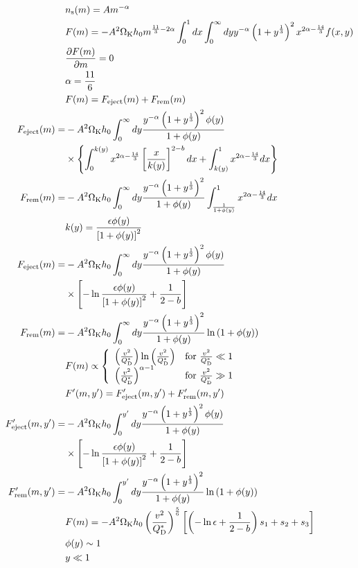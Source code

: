 \documentclass[11pt,a4paper,oneside,onecolumn]{jreport}
\begin{document}
\begin{align}
 &n_{\rm s} (m) = A m^{- \alpha}\\
 &F (m) = - A^2 \Omega_{\rm K} h_0 m^{\frac{11}{3} - 2 \alpha} \int_0^1 dx \int_0^{\infty} dy y^{-\alpha} \left( 1 + y^{\frac{1}{3}} \right)^2 x^{2 \alpha - \frac{14}{3}} f(x, y)\\
 &\frac{\partial F(m)}{\partial m} = 0\\ 
 &\alpha = \frac{11}{6}\\
 &F(m) = F_{\rm eject}(m) + F_{\rm rem}(m)\\
 F_{\rm eject}(m) = & - A^2 \Omega_{\rm K} h_0 \int_0^{\infty} dy \frac{y^{- \alpha} \left( 1 + y^{\frac{1}{3}} \right)^2 \phi(y)}{1 + \phi(y)}\\
 &\times \left\{ \int_0^{k(y)} x^{2 \alpha - \frac{14}{3}}\left[ \frac{x}{k(y)} \right]^{2-b} dx + \int_{k(y)}^1 x^{2 \alpha - \frac{14}{3}} dx \right\}\\
 F_{\rm rem}(m) = & - A^2 \Omega_{\rm K} h_0 \int_0^{\infty} dy \frac{y^{- \alpha} \left( 1 + y^{\frac{1}{3}} \right)^2}{1 + \phi(y)} \int_{\frac{1}{1 + \phi(y)}}^1 x^{2 \alpha - \frac{14}{3}} dx\\
 &k(y) = \frac{\epsilon \phi(y)}{\left[ 1 + \phi(y) \right]^2}\\
 F_{\rm eject}(m) = & - A^2 \Omega_{\rm K} h_0 \int_0^{\infty} dy \frac{y^{- \alpha} \left( 1 + y^{\frac{1}{3}} \right)^2 \phi(y)}{1 + \phi(y)}\\
 &\times \left[ - \ln \frac{\epsilon \phi(y)}{\left[ 1 + \phi(y) \right]^2} + \frac{1}{2 - b} \right]\\
 F_{\rm rem}(m) = & - A^2 \Omega_{\rm K} h_0 \int_0^{\infty} dy \frac{y^{- \alpha} \left( 1 + y^{\frac{1}{3}} \right)^2}{1 + \phi(y)} \ln \left( 1 + \phi(y) \right)\\
 &F(m) \propto \left\{
 \begin{array}{ll}
  \left(\frac{v^2}{Q_{\rm D}^{\ast}}\right) \ln \left(\frac{v^2}{Q_{\rm D}^{\ast}}\right) & {\rm for}\ \frac{v^2}{Q_{\rm D}^{\ast}} \ll 1\\
  \left(\frac{v^2}{Q_{\rm D}^{\ast}}\right)^{\alpha - 1} & {\rm for}\ \frac{v^2}{Q_{\rm D}^{\ast}} \gg 1\\
 \end{array}
 \right.\\
 &F'(m, y') = F'_{\rm eject} (m, y') + F'_{\rm rem} (m, y')\\
 F'_{\rm eject}(m, y') = & - A^2 \Omega_{\rm K} h_0 \int_0^{y'} dy \frac{y^{- \alpha} \left( 1 + y^{\frac{1}{3}} \right)^2 \phi(y)}{1 + \phi(y)}\\
 &\times \left[ - \ln \frac{\epsilon \phi(y)}{\left[ 1 + \phi(y) \right]^2} + \frac{1}{2 - b} \right]\\
 F'_{\rm rem}(m, y') = & - A^2 \Omega_{\rm K} h_0 \int_0^{y'} dy \frac{y^{- \alpha} \left( 1 + y^{\frac{1}{3}} \right)^2}{1 + \phi(y)} \ln \left( 1 + \phi(y) \right)\\
 &F(m) = - A^2 \Omega_{\rm K} h_0 \left( \frac{v^2}{Q_{\rm D}^{\ast}} \right)^{\frac{5}{6}} \left[ \left( - \ln \epsilon + \frac{1}{2 - b} \right) s_1 + s_2 + s_3 \right]\\
 &\phi(y) \sim 1\\
 &y \ll 1
\end{align}
\end{document}
